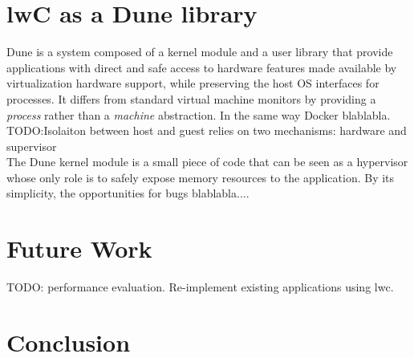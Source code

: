 \documentclass[letterpaper,twocolumn,10pt]{article}
\begin{document}
\section{lwC as a Dune library}

Dune is a system composed of a kernel module and a user library that provide applications with direct and safe access to hardware features made available by virtualization hardware support, while preserving the host OS interfaces for processes.
It differs from standard virtual machine monitors by providing a \emph{process} rather than a \emph{machine} abstraction. 
In the same way Docker blablabla.\\

TODO:Isolaiton between host and guest relies on two mechanisms: hardware and supervisor \\

The Dune kernel module is a small piece of code that can be seen as a hypervisor whose only role is to safely expose memory resources to the application.
By its simplicity, the opportunities for bugs blablabla....\\




\section{Future Work}
TODO: performance evaluation.
Re-implement existing applications using lwc.

\section{Conclusion}
\end{document}
